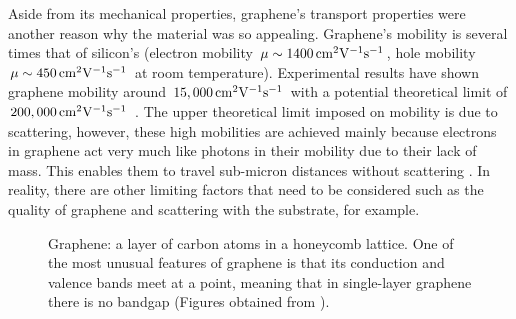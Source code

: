 Aside from its mechanical properties, graphene's transport properties were another reason why the material was so appealing. Graphene's mobility is several times that of silicon's (electron mobility $\mu\sim 1400\,\mathrm{cm}^{2}\mathrm{V}^{-1}\mathrm{s}^{-1}$, hole mobility $\mu\sim 450\,\mathrm{cm}^{2}\mathrm{V}^{-1}\mathrm{s}^{-1}$ at room temperature). Experimental results have shown graphene mobility around $15,000\,\mathrm{cm}^{2}\mathrm{V}^{-1}\mathrm{s}^{-1}$ with a potential theoretical limit of $200,000\,\mathrm{cm}^{2}\mathrm{V}^{-1}\mathrm{s}^{-1}$ \cite{Dargys_Encylco1994,Akinwande_NatureComm2014,Si_Properties}. The upper theoretical limit imposed on mobility is due to scattering, however, these high mobilities are achieved mainly because electrons in graphene act very much like photons in their mobility due to their lack of mass. This enables them to travel sub-micron distances without scattering \cite{Novoselov_NatureMat2007}. In reality, there are other limiting factors that need to be considered such as the quality of graphene and scattering with the substrate, for example. 
\begin{figure}[ht]
	\centering
	\qquad
	\caption[Lattice and band structure of graphene]{\protect{} Graphene: a layer of carbon atoms in a honeycomb lattice. \protect{} One of the most unusual features of graphene is that its conduction and valence bands meet at a point, meaning that in single-layer graphene there is no bandgap (Figures obtained from \cite{Berkley_Online2009}).}
	\label{fig:graphene_structures}
\end{figure}

